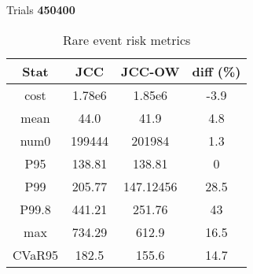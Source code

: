 \begin{table}
\centering
Trials \textbf{450400}

\begin{tabular}{|c |  c c | c|}
\hline
Stat & JCC & JCC-OW & diff (\%) \\
\hline
cost&1.78e6 & 1.85e6 & \alert{-3.9} \\
mean&44.0&41.9 & 4.8   \\
num0&199444 & 201984 & 1.3 \\
P95& 138.81& 138.81  &  0         \\
P99& 205.77& 147.12456 &  28.5        \\
P99.8& 441.21& 251.76   &  43      \\
max& 734.29& 612.9      &  16.5            \\
CVaR95 & 182.5 & 155.6 & 14.7 \\
\hline
\end{tabular}
\caption{Rare event risk metrics}
\end{table}


